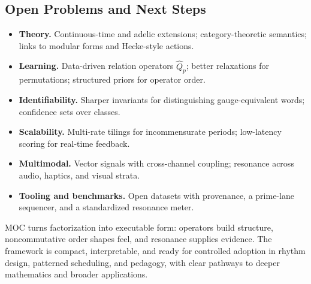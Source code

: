 \documentclass[12pt]{article}
\numberwithin{equation}{section}
\theoremstyle{plain}
\theoremstyle{definition}
\theoremstyle{remark}
\begin{document}
\subsection*{Open Problems and Next Steps}
\begin{itemize}
  \item \textbf{Theory.} Continuous-time and adelic extensions; category-theoretic semantics; links to modular forms and Hecke-style actions.
  \item \textbf{Learning.} Data-driven relation operators $\hat{Q}_p$; better relaxations for permutations; structured priors for operator order.
  \item \textbf{Identifiability.} Sharper invariants for distinguishing gauge-equivalent words; confidence sets over classes.
  \item \textbf{Scalability.} Multi-rate tilings for incommensurate periods; low-latency scoring for real-time feedback.
  \item \textbf{Multimodal.} Vector signals with cross-channel coupling; resonance across audio, haptics, and visual strata.
  \item \textbf{Tooling and benchmarks.} Open datasets with provenance, a prime-lane sequencer, and a standardized resonance meter.
\end{itemize}
MOC turns factorization into executable form: operators build structure, noncommutative order shapes feel, and resonance supplies evidence. The framework is compact, interpretable, and ready for controlled adoption in rhythm design, patterned scheduling, and pedagogy, with clear pathways to deeper mathematics and broader applications.
\end{document}
